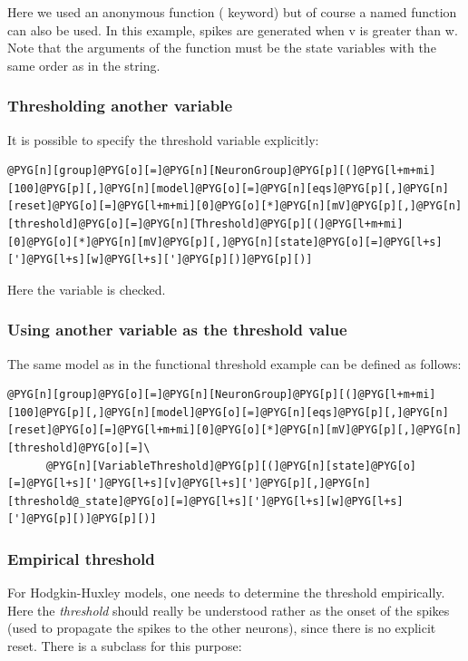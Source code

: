 \documentclass[letterpaper,10pt,english]{manual}
\begin{document}
Here we used an anonymous function ( keyword) but of course a named function can also
be used. In this example, spikes are generated when v is greater than w.
Note that the arguments of the function must be the state variables with the same order as
in the \hyperlink{brian.Equations}{} string.


\subsubsection{Thresholding another variable}

It is possible to specify the threshold variable explicitly:

\begin{Verbatim}[commandchars=@\[\]]
@PYG[n][group]@PYG[o][=]@PYG[n][NeuronGroup]@PYG[p][(]@PYG[l+m+mi][100]@PYG[p][,]@PYG[n][model]@PYG[o][=]@PYG[n][eqs]@PYG[p][,]@PYG[n][reset]@PYG[o][=]@PYG[l+m+mi][0]@PYG[o][*]@PYG[n][mV]@PYG[p][,]@PYG[n][threshold]@PYG[o][=]@PYG[n][Threshold]@PYG[p][(]@PYG[l+m+mi][0]@PYG[o][*]@PYG[n][mV]@PYG[p][,]@PYG[n][state]@PYG[o][=]@PYG[l+s][']@PYG[l+s][w]@PYG[l+s][']@PYG[p][)]@PYG[p][)]
\end{Verbatim}

Here the variable  is checked.


\subsubsection{Using another variable as the threshold value}

The same model as in the functional threshold example can be defined as follows:

\begin{Verbatim}[commandchars=@\[\]]
@PYG[n][group]@PYG[o][=]@PYG[n][NeuronGroup]@PYG[p][(]@PYG[l+m+mi][100]@PYG[p][,]@PYG[n][model]@PYG[o][=]@PYG[n][eqs]@PYG[p][,]@PYG[n][reset]@PYG[o][=]@PYG[l+m+mi][0]@PYG[o][*]@PYG[n][mV]@PYG[p][,]@PYG[n][threshold]@PYG[o][=]\
      @PYG[n][VariableThreshold]@PYG[p][(]@PYG[n][state]@PYG[o][=]@PYG[l+s][']@PYG[l+s][v]@PYG[l+s][']@PYG[p][,]@PYG[n][threshold@_state]@PYG[o][=]@PYG[l+s][']@PYG[l+s][w]@PYG[l+s][']@PYG[p][)]@PYG[p][)]
\end{Verbatim}


\subsubsection{Empirical threshold}

For Hodgkin-Huxley models, one needs to determine the threshold empirically. Here the
\emph{threshold} should really be understood rather as the onset of the spikes (used to propagate
the spikes to the other neurons), since there is no explicit reset. There is a
\hyperlink{brian.Threshold}{\code{Threshold}} subclass for this purpose:
\end{document}
